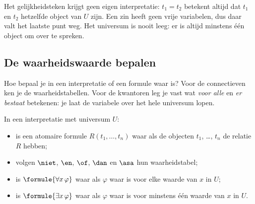 Het gelijkheidsteken krijgt geen eigen interpretatie: $t_1 = t_2$ betekent altijd dat $t_1$ en $t_2$ hetzelfde object van $U$ zijn. Een zin heeft geen vrije variabelen, dus daar valt het laatste punt weg. Het universum is nooit leeg: er is altijd minstens één object om over te spreken.


\begin{oefeningen}
\end{oefeningen}

\subsection{De waarheidswaarde bepalen}

Hoe bepaal je in een interpretatie of een formule waar is? Voor de connectieven ken je de waarheidstabellen. Voor de kwantoren leg je vast wat \textit{voor alle} en \textit{er bestaat} betekenen: je laat de variabele over het hele universum lopen.

\begin{theorie}
In een interpretatie met universum $U$:
\begin{itemize}[leftmargin=6mm,itemsep=.5mm]
\item is een atomaire formule $R(t_1, \ldots, t_n)$ waar als de objecten $t_1$, \ldots, $t_n$ de relatie $R$ hebben;
\item volgen $\niet$, $\en$, $\of$, $\dan$ en $\asa$ hun waarheidstabel;
\item is $\formule{\forall x\, \varphi}$ waar als $\varphi$ waar is voor elke waarde van $x$ in $U$;
\item is $\formule{\exists x\, \varphi}$ waar als $\varphi$ waar is voor minstens één waarde van $x$ in $U$.
\end{itemize}
\end{theorie}


